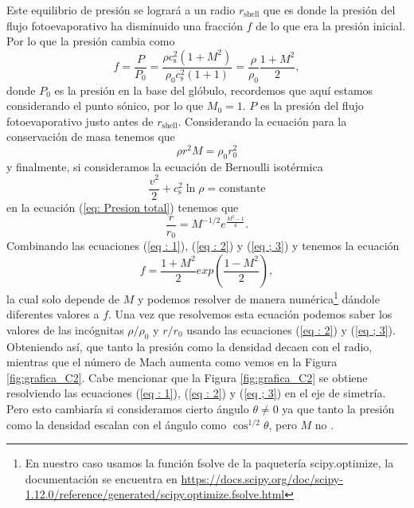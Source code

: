 \documentclass{book}
\begin{document}
Este equilibrio de presión se logrará a un radio $r_\mathrm{shell}$ que es donde la presión del flujo fotoevaporativo ha disminuido una fracción $f$ de lo que era la presión inicial. Por lo que la presión cambia como 
\begin{equation}\label{eq : 1}
f=\frac{P}{P_0}=\frac{\rho c_\mathrm{s}^2(1+M^2)}{\rho_0 c_\mathrm{s}^2(1+1)}=\frac{\rho}{\rho_0}\frac{1+M^2}{2},
\end{equation}
donde $P_0$ es la presión en la base del glóbulo, recordemos que aquí estamos considerando el punto sónico, por lo que  $M_0=1$. $P$ es la presión del flujo fotoevaporativo justo antes de $r_\mathrm{shell}$.
Considerando la ecuación para la conservación de masa tenemos que
\begin{equation}\label{eq : 2}
\rho r^2M	=\rho_0 r_0^2
\end{equation}
y finalmente, si consideramos la ecuación de Bernoulli isotérmica 
\begin{equation}
\frac{v^2}{2}+c_\mathrm{s}^2\ln\rho=\text{constante}
\end{equation}
en la ecuación (\ref{eq: Presion total}) tenemos que \citep{Dyson:1968}
\begin{equation}\label{eq ; 3} \frac{r}{r_0}=M^{-1/2}e^{\frac{M^2-1}{4}}.
\end{equation}
Combinando las ecuaciones (\ref{eq : 1}), (\ref{eq : 2}) y (\ref{eq ; 3})  y tenemos la ecuación
\begin{equation}
    f=\frac{1+M^2}{2}exp\left(\frac{1-M^2}{2}\right),
\end{equation}
la cual solo depende de $M$ y podemos resolver de manera numérica\footnote{En nuestro caso usamos la función fsolve de la paquetería scipy.optimize, la documentación se encuentra en \url{https://docs.scipy.org/doc/scipy-1.12.0/reference/generated/scipy.optimize.fsolve.html}} dándole diferentes valores a $f$. Una vez que resolvemos esta ecuación podemos saber los valores de las incógnitas  $\rho/\rho_0$ y $r/r_0$ usando las ecuaciones (\ref{eq : 2}) y (\ref{eq ; 3}). Obteniendo así, que tanto la presión como la densidad decaen con el radio, mientras que el número de Mach aumenta como vemos en la Figura \ref{fig:grafica_C2}. Cabe mencionar que la Figura \ref{fig:grafica_C2} se obtiene resolviendo las ecuaciones (\ref{eq : 1}), (\ref{eq : 2}) y (\ref{eq ; 3}) en el eje de simetría. Pero esto cambiaría si consideramos cierto ángulo $\theta\neq 0 $ ya que tanto la presión como la densidad escalan con el ángulo como $\cos^{1/2}\theta$, pero $M$ no \citep{Tarango:2018}.
\end{document}
